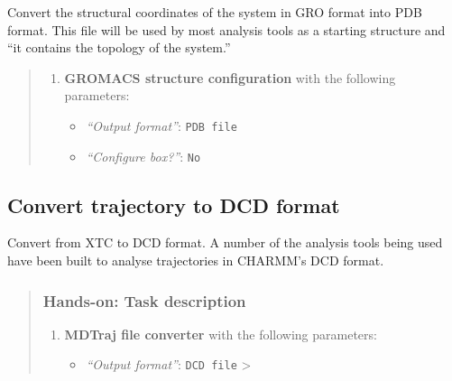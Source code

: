 \documentclass[twocolumn]{bmcart}%
\providecommand{\tightlist}{%
  \setlength{\itemsep}{0pt}\setlength{\parskip}{0pt}}
\providecommand{\tightlist}{%
  \setlength{\itemsep}{0pt}\setlength{\parskip}{0pt}}
\begin{document}
Convert the structural coordinates of the system in GRO format into PDB
format. This file will be used by most analysis tools as a starting
structure and ``it contains the topology of the system.''

\begin{quote}

\begin{enumerate}
\def\labelenumi{\arabic{enumi}.}
\tightlist
\item
  \textbf{GROMACS structure configuration} with the following
  parameters:

  \begin{itemize}
  \tightlist
  \item
    \emph{``Output format''}: \texttt{PDB\ file}
  \item
    \emph{``Configure box?''}: \texttt{No}
  \end{itemize}
\end{enumerate}


\end{quote}

\hypertarget{convert-trajectory-to-dcd-format}{%
\subsection{Convert trajectory to DCD
format}\label{convert-trajectory-to-dcd-format}}

Convert from XTC to DCD format. A number of the analysis tools being
used have been built to analyse trajectories in CHARMM's DCD format.

\begin{quote}
\hypertarget{hands-on-task-description-8}{%
\subsubsection{Hands-on: Task
description}\label{hands-on-task-description-8}}

\begin{enumerate}
\def\labelenumi{\arabic{enumi}.}
\tightlist
\item
  \textbf{MDTraj file converter} with the following parameters:

  \begin{itemize}
  \tightlist
  \item
    \emph{``Output format''}: \texttt{DCD\ file} \textgreater{}
  \end{itemize}
\end{enumerate}


\end{quote}
\end{document}
